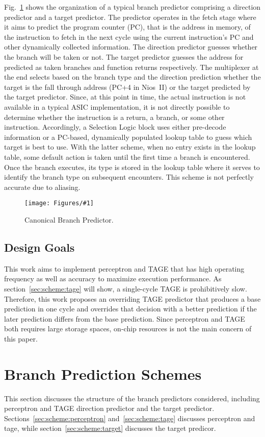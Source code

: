 \documentclass[conference]{IEEEtran}
\newcommand{\kfig}[4]{ %
        \begin{figure}[!t]
        \centering
        \texttt{[image: Figures/\#1]}
        \vspace{-1mm}
        \caption{#3}
        \label{#2}
        \end{figure}
}
\begin{document}
Fig.~\ref{fig:bpcanonical} shows the organization of a typical branch predictor comprising a direction predictor and a target predictor.  The predictor operates in the fetch stage where it aims to predict the program counter (PC), that is the address in memory, of the instruction to fetch in the next cycle using the current instruction's PC and other dynamically collected information. The direction predictor guesses whether the branch will be taken or not. The target predictor guesses the address for predicted as taken branches and function returns respectively. The multiplexer at the end selects based on the branch type and the direction prediction whether the target is the fall through address (PC+4 in Nios~II) or the target predicted by the target predictor. Since, at this point in time, the actual instruction is not available in a typical ASIC implementation, it is not directly possible to determine whether the instruction is a return, a branch, or some other instruction. Accordingly, a Selection Logic block uses either pre-decode information or a PC-based, dynamically populated lookup table to guess which target is best to use. With the latter scheme, when no entry exists in the lookup table, some default action is taken until the first time a branch is encountered. Once the branch executes, its type is stored in the lookup table where it serves to identify the branch type on subsequent encounters. This scheme is not perfectly accurate due to aliasing.
\kfig{bpcanonical.pdf}{fig:bpcanonical}{Canonical Branch Predictor.}{angle = 0, trim = 0.2in 1.7in 0.4in 0.1in, clip, width=0.4\textwidth}

\subsection{Design Goals}
\label{sec:background:goal}

This work aims to implement perceptron and TAGE that has high operating frequency as well as accuracy to maximize execution performance. As section~\ref{sec:scheme:tage} will show, a single-cycle TAGE is prohibitively slow. Therefore, this work proposes an overriding TAGE predictor that produces a base prediction in one cycle and overrides that decision with a better prediction if the later prediction differs from the base prediction. Since perceptron and TAGE both requires large storage spaces, on-chip resources is not the main concern of this paper.

\section{Branch Prediction Schemes}
\label{sec:scheme}
This section discusses the structure of the branch predictors considered, including perceptron and TAGE direction predictor and the target predictor. Sections~\ref{sec:scheme:perceptron} and~\ref{sec:scheme:tage} discusses perceptron and tage, while section~\ref{sec:scheme:target} discusses the target predicor.
\end{document}
